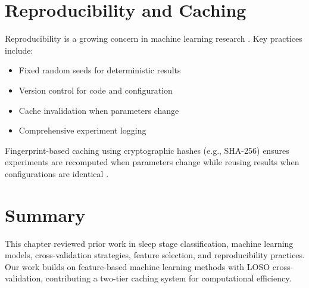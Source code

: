 
\section{Reproducibility and Caching}
\label{sec:reproducibility}

Reproducibility is a growing concern in machine learning research \cite{TODO_ADD_REPRODUCIBILITY_REF}. Key practices include:

\begin{itemize}
    \item Fixed random seeds for deterministic results
    \item Version control for code and configuration
    \item Cache invalidation when parameters change
    \item Comprehensive experiment logging
\end{itemize}

Fingerprint-based caching using cryptographic hashes (e.g., SHA-256) ensures experiments are recomputed when parameters change while reusing results when configurations are identical \cite{TODO_ADD_CACHING_REF}.

\section{Summary}
\label{sec:related_summary}

This chapter reviewed prior work in sleep stage classification, machine learning models, cross-validation strategies, feature selection, and reproducibility practices. Our work builds on feature-based machine learning methods with LOSO cross-validation, contributing a two-tier caching system for computational efficiency.
